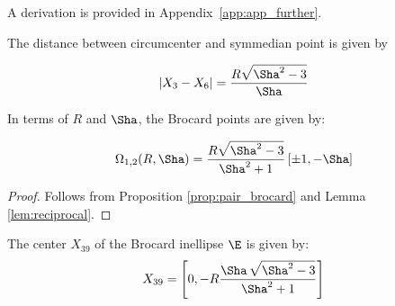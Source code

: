 \noindent A derivation is provided in Appendix~\ref{app:app_further}.

\begin{corollary} The distance between circumcenter and symmedian point is given by

\[ |X_3-X_6|=\frac{R\sqrt{ \Sha^2 -3}}{ \Sha}\]
\end{corollary}

\begin{proposition}
In terms of $R$ and $\Sha$, the Brocard points are given by:

 \[\Omega_{1,2}(R,\Sha)=\frac{R\sqrt{ \Sha^2-3}}{ \Sha^2+1} \left[\pm1, - \Sha  \right]\]
 \label{prop:brocs12}
\end{proposition}

\begin{proof} Follows from Proposition \ref{prop:pair_brocard} and Lemma \ref{lem:reciprocal}.
\end{proof}

\begin{corollary}
The center $X_{39}$ of the Brocard inellipse $\E$ is given by:
\[ X_{39}=\left[0,-R {\frac {\Sha\,
\sqrt {\Sha^2-3}}{\Sha^2+1}} \right]\]
\end{corollary}





